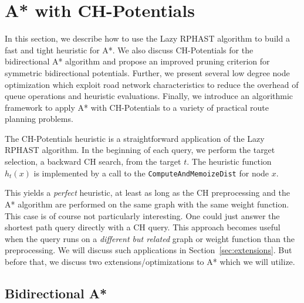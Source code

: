 \documentclass[a4paper,UKenglish,cleveref, autoref, thm-restate]{lipics-v2021}
\begin{document}
\section{A* with CH-Potentials}\label{sec:main-algo}

In this section, we describe how to use the Lazy RPHAST algorithm to build a fast and tight heuristic for A*.
We also discuss CH-Potentials for the bidirectional A* algorithm and propose an improved pruning criterion for symmetric bidirectional potentials.
Further, we present several low degree node optimization which exploit road network characteristics to reduce the overhead of queue operations and heuristic evaluations.
Finally, we introduce an algorithmic framework to apply A* with CH-Potentials to a variety of practical route planning problems.

The CH-Potentials heuristic is a straightforward application of the Lazy RPHAST algorithm.
In the beginning of each query, we perform the target selection, a backward CH search, from the target $t$.
The heuristic function $h_t(x)$ is implemented by a call to the \texttt{ComputeAndMemoizeDist} for node $x$.

This yields a \emph{perfect} heuristic, at least as long as the CH preprocessing and the A* algorithm are performed on the same graph with the same weight function.
This case is of course not particularly interesting.
One could just answer the shortest path query directly with a CH query.
This approach becomes useful when the query runs on a \emph{different but related} graph or weight function than the preprocessing.
We will discuss such applications in Section~\ref{sec:extensions}.
But before that, we discuss two extensions/optimizations to A* which we will utilize.

\subsection{Bidirectional A*}
\end{document}
